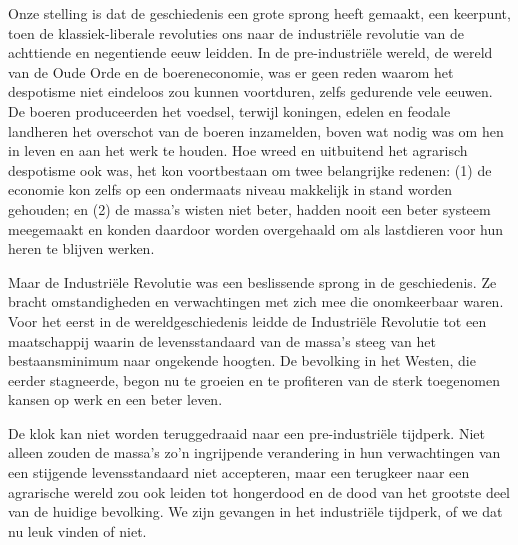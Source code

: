 \documentclass[
  a5paper,
  smalldemyvopaper,10pt,twoside,onecolumn,openright,extrafontsizes,hidelinks]{memoir}
\begin{document}
Onze stelling is dat de geschiedenis een grote sprong heeft gemaakt, een
keerpunt, toen de klassiek-liberale revoluties ons naar de industriële
revolutie van de achttiende en negentiende eeuw leidden. In de
pre-industriële wereld, de wereld van de Oude Orde en de boereneconomie,
was er geen reden waarom het despotisme niet eindeloos zou kunnen
voortduren, zelfs gedurende vele eeuwen. De boeren produceerden het
voedsel, terwijl koningen, edelen en feodale landheren het overschot van
de boeren inzamelden, boven wat nodig was om hen in leven en aan het
werk te houden. Hoe wreed en uitbuitend het agrarisch despotisme ook
was, het kon voortbestaan om twee belangrijke redenen: (1) de economie
kon zelfs op een ondermaats niveau makkelijk in stand worden gehouden;
en (2) de massa's wisten niet beter, hadden nooit een beter systeem
meegemaakt en konden daardoor worden overgehaald om als lastdieren voor
hun heren te blijven werken.

Maar de Industriële Revolutie was een beslissende sprong in de
geschiedenis. Ze bracht omstandigheden en verwachtingen met zich mee die
onomkeerbaar waren. Voor het eerst in de wereldgeschiedenis leidde de
Industriële Revolutie tot een maatschappij waarin de levensstandaard van
de massa's steeg van het bestaansminimum naar ongekende hoogten. De
bevolking in het Westen, die eerder stagneerde, begon nu te groeien en
te profiteren van de sterk toegenomen kansen op werk en een beter leven.

De klok kan niet worden teruggedraaid naar een pre-industriële tijdperk.
Niet alleen zouden de massa's zo'n ingrijpende verandering in hun
verwachtingen van een stijgende levensstandaard niet accepteren, maar
een terugkeer naar een agrarische wereld zou ook leiden tot hongerdood
en de dood van het grootste deel van de huidige bevolking. We zijn
gevangen in het industriële tijdperk, of we dat nu leuk vinden of niet.
\end{document}
